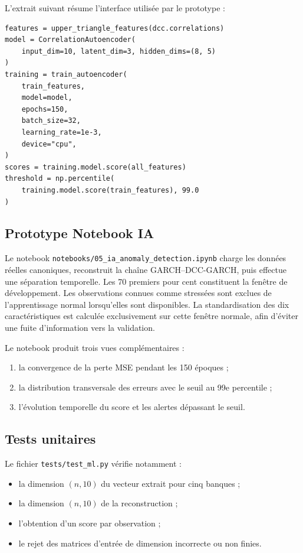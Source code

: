 \documentclass[12pt,a4paper]{article}
\begin{document}
L'extrait suivant résume l'interface utilisée par le prototype :

\begin{lstlisting}
features = upper_triangle_features(dcc.correlations)
model = CorrelationAutoencoder(
    input_dim=10, latent_dim=3, hidden_dims=(8, 5)
)
training = train_autoencoder(
    train_features,
    model=model,
    epochs=150,
    batch_size=32,
    learning_rate=1e-3,
    device="cpu",
)
scores = training.model.score(all_features)
threshold = np.percentile(
    training.model.score(train_features), 99.0
)
\end{lstlisting}

\subsection{Prototype Notebook IA}

Le notebook \texttt{notebooks/05\_ia\_anomaly\_detection.ipynb} charge les données réelles
canoniques, reconstruit la chaîne GARCH--DCC-GARCH, puis effectue une séparation temporelle.
Les 70 premiers pour cent constituent la fenêtre de développement. Les observations connues comme
stressées sont exclues de l'apprentissage normal lorsqu'elles sont disponibles. La
standardisation des dix caractéristiques est calculée exclusivement sur cette fenêtre normale,
afin d'éviter une fuite d'information vers la validation.

Le notebook produit trois vues complémentaires :
\begin{enumerate}
  \item la convergence de la perte MSE pendant les 150 époques ;
  \item la distribution transversale des erreurs avec le seuil au 99e percentile ;
  \item l'évolution temporelle du score et les alertes dépassant le seuil.
\end{enumerate}

\subsection{Tests unitaires}

Le fichier \texttt{tests/test\_ml.py} vérifie notamment :
\begin{itemize}
  \item la dimension $(n,10)$ du vecteur extrait pour cinq banques ;
  \item la dimension $(n,10)$ de la reconstruction ;
  \item l'obtention d'un score par observation ;
  \item le rejet des matrices d'entrée de dimension incorrecte ou non finies.
\end{itemize}
\end{document}
